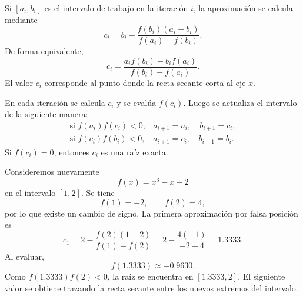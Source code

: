 \documentclass[a4,11pt]{aleph-notas}
\begin{document}
\begin{defi}
    Si $[a_i,b_i]$ es el intervalo de trabajo en la iteración $i$, la aproximación se calcula mediante
    \[
        c_i = b_i-\frac{f(b_i)(a_i-b_i)}{f(a_i)-f(b_i)}.
    \]
    De forma equivalente,
    \[
        c_i=\frac{a_i f(b_i)-b_i f(a_i)}{f(b_i)-f(a_i)}.
    \]
    El valor $c_i$ corresponde al punto donde la recta secante corta al eje $x$.
\end{defi}

\begin{defi}
    En cada iteración se calcula $c_i$ y se evalúa $f(c_i)$. Luego se actualiza el intervalo de la siguiente manera:
    \[
        \begin{array}{ll}
        \text{si } f(a_i)f(c_i)<0, & a_{i+1}=a_i,\quad b_{i+1}=c_i,\\[1mm]
        \text{si } f(c_i)f(b_i)<0, & a_{i+1}=c_i,\quad b_{i+1}=b_i.
        \end{array}
    \]
    Si $f(c_i)=0$, entonces $c_i$ es una raíz exacta.
\end{defi}

\begin{pscodigo}
\begin{function}[H]
\end{function}
\end{pscodigo}

\begin{ejem}
    Consideremos nuevamente
    \[
        f(x)=x^3-x-2
    \]
    en el intervalo $[1,2]$. Se tiene
    \[
        f(1)=-2,\qquad f(2)=4,
    \]
    por lo que existe un cambio de signo. La primera aproximación por falsa posición es
    \[
        c_1
        =2-\frac{f(2)(1-2)}{f(1)-f(2)}
        =2-\frac{4(-1)}{-2-4}
        =1.3333.
    \]
    Al evaluar,
    \[
        f(1.3333)\approx -0.9630.
    \]
    Como $f(1.3333)f(2)<0$, la raíz se encuentra en $[1.3333,2]$. El siguiente valor se obtiene trazando la recta secante entre los nuevos extremos del intervalo.
\end{ejem}
\end{document}
